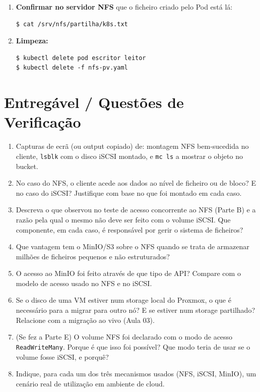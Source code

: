 \documentclass[11pt,a4paper]{article}
\begin{document}
\begin{enumerate}[label=\arabic*.]
    \item \textbf{Confirmar no servidor NFS} que o ficheiro criado pelo Pod está lá:
\begin{lstlisting}
$ cat /srv/nfs/partilha/k8s.txt
\end{lstlisting}

    \item \textbf{Limpeza:}
\begin{lstlisting}
$ kubectl delete pod escritor leitor
$ kubectl delete -f nfs-pv.yaml
\end{lstlisting}
\end{enumerate}

\section{Entregável / Questões de Verificação}
\begin{enumerate}[label=\alph*)]
    \setlength\itemsep{0.2cm}
    \item Capturas de ecrã (ou output copiado) de: montagem NFS bem-sucedida no cliente, \texttt{lsblk} com o disco iSCSI montado, e \texttt{mc ls} a mostrar o objeto no bucket.
    \item No caso do NFS, o cliente acede aos dados ao nível de ficheiro ou de bloco? E no caso do iSCSI? Justifique com base no que foi montado em cada caso.
    \item Descreva o que observou no teste de acesso concorrente ao NFS (Parte B) e a razão pela qual o mesmo não deve ser feito com o volume iSCSI. Que componente, em cada caso, é responsável por gerir o sistema de ficheiros?
    \item Que vantagem tem o MinIO/S3 sobre o NFS quando se trata de armazenar milhões de ficheiros pequenos e não estruturados?
    \item O acesso ao MinIO foi feito através de que tipo de API? Compare com o modelo de acesso usado no NFS e no iSCSI.
    \item Se o disco de uma VM estiver num storage local do Proxmox, o que é necessário para a migrar para outro nó? E se estiver num storage partilhado? Relacione com a migração ao vivo (Aula 03).
    \item (Se fez a Parte E) O volume NFS foi declarado com o modo de acesso
    \texttt{ReadWriteMany}. Porque é que isso foi possível? Que modo teria de usar
    se o volume fosse iSCSI, e porquê?
    \item Indique, para cada um dos três mecanismos usados (NFS, iSCSI, MinIO), um cenário real de utilização em ambiente de cloud.
\end{enumerate}
\end{document}
